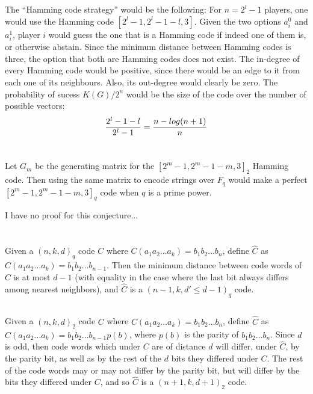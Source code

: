 \documentclass[11pt]{article} \usepackage{amssymb}
\begin{document}
\subsection{}
The ``Hamming code strategy'' would be the following: For $n=2^l-1$ players, 
one would use the Hamming code $[2^l-1, 2^l-1-l, 3]$.
Given the two
options $a_i^0$ and $a_i^1$, player $i$ would guess the one that is a Hamming
code if indeed one of them is, or otherwise abstain. Since the minimum
distance between Hamming codes is three, the option that both are Hamming
codes does not exist. The in-degree of every Hamming code would
be positive, since there would be an edge to it from each one of its 
neighbours. Also, its out-degree would clearly be zero. 
The probability of sucess $K(G)/2^n$ would be the size of the code
over the number of possible vectors: 
\begin{equation}
  {2^l-1-l\over 2^l-1}={n - log(n+1) \over n}
\end{equation}

\section{}
Let $G_m$ be the generating matrix for the $[2^m-1,2^m-1-m,3]_2$ Hamming 
code. Then using the same matrix to encode strings over $F_q$ would make
a perfect $[2^m-1,2^m-1-m,3]_q$ code when $q$ is a prime power.

I have no proof for this conjecture...

\section{}
\subsection{}
Given a $(n,k,d)_q$ code $C$ where 
$C(a_1a_2\ldots a_k)=b_1b_2\ldots b_n$, define $\hat{C}$ as 
$\hat{C}(a_1a_2\ldots a_k)=b_1b_2\ldots b_{n-1}$. Then the minimum distance between code words of
$\hat{C}$ is at most $d-1$ (with equality in the case where
the last bit always differs among nearest neighbors), 
and $\hat{C}$ is a $(n-1,k,d'\leq d - 1)_q$ code.  
\subsection{}
Given a $(n,k,d)_2$ code $C$ where 
$C(a_1a_2\ldots a_k)=b_1b_2\ldots b_n$, define $\hat{C}$ as 
$\hat{C}(a_1a_2\ldots a_k)=b_1b_2\ldots b_{n-1}p(b)$, where $p(b)$ is the parity
of $b_1b_2\ldots b_n$. Since $d$ is odd, then code words which under $C$ are
of distance $d$ will differ, under $\hat{C}$, by the parity bit, as well as by the rest
of the $d$ bits they differed under $C$. 
The rest of the code words 
may or may not differ by the parity bit, but will differ by the bits they 
differed under $C$, and so $\hat{C}$ is a $(n+1,k,d +1)_2$ code.  
\end{document}
